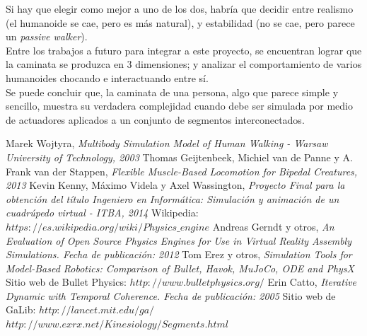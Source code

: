 \documentclass{article}
\begin{document}
Si hay que elegir como mejor a uno de los dos, habr\'ia que decidir entre realismo (el humanoide se cae, pero es m\'as natural), y estabilidad (no se cae, pero parece un \textit{passive walker}).\\
Entre los trabajos a futuro para integrar a este proyecto, se encuentran lograr que la caminata se produzca en 3 dimensiones; y analizar el comportamiento de varios humanoides chocando e  interactuando entre s\'i.\\
Se puede concluir que, la caminata de una persona, algo que parece simple y sencillo, muestra su verdadera complejidad cuando debe ser simulada por medio de actuadores aplicados a un conjunto de segmentos interconectados.



\begin{thebibliography}{1}
Marek Wojtyra, \emph{Multibody Simulation Model of Human Walking - Warsaw University of Technology, 2003}
Thomas Geijtenbeek, Michiel van de Panne y A. Frank van der Stappen, \emph{Flexible Muscle-Based Locomotion for Bipedal Creatures, 2013 }
Kevin Kenny, M\'aximo Videla y Axel Wassington, \emph{Proyecto Final para la obtenci\'on del t\'itulo Ingeniero en Inform\'atica: Simulaci\'on y animaci\'on de un cuadr\'upedo virtual - ITBA, 2014}
 Wikipedia: $https://es.wikipedia.org/wiki/Physics\_engine$
Andreas Gerndt y otros, \emph{An Evaluation of Open Source Physics Engines for Use in Virtual Reality Assembly Simulations. Fecha de publicaci\'on: 2012}
Tom Erez y otros, \emph{Simulation Tools for Model-Based Robotics: Comparison of \textit{Bullet}, Havok, MuJoCo, ODE and PhysX}
 Sitio web de Bullet Physics: $http://www.bulletphysics.org/$
Erin Catto, \emph{Iterative Dynamic with Temporal Coherence. Fecha de publicaci\'on: 2005}
 Sitio web de GaLib: $http://lancet.mit.edu/ga/$
$http://www.exrx.net/Kinesiology/Segments.html$

\end{thebibliography}

\end{document}
